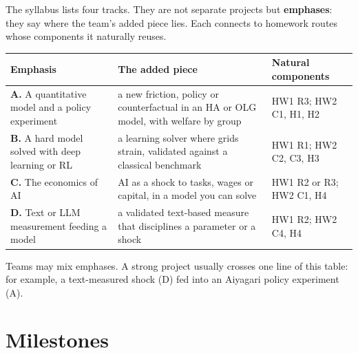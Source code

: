 \documentclass[11pt]{article}
\begin{document}
The syllabus lists four tracks. They are not separate projects but \textbf{emphases}: they say
where the team's added piece lies. Each connects to homework routes whose components it naturally
reuses.

\medskip
{\small
\renewcommand{\arraystretch}{1.2}
\noindent\begin{tabularx}{\linewidth}{@{}p{4.4cm}Lp{3.6cm}@{}}
\toprule
\textbf{Emphasis} & \textbf{The added piece} & \textbf{Natural components} \\
\midrule
\textbf{A.} A quantitative model and a policy experiment & a new friction, policy or counterfactual in an HA or OLG model, with welfare by group & HW1 R3; HW2 C1, H1, H2 \\
\textbf{B.} A hard model solved with deep learning or RL & a learning solver where grids strain, validated against a classical benchmark & HW1 R1; HW2 C2, C3, H3 \\
\textbf{C.} The economics of AI & AI as a shock to tasks, wages or capital, in a model you can solve & HW1 R2 or R3; HW2 C1, H4 \\
\textbf{D.} Text or LLM measurement feeding a model & a validated text-based measure that disciplines a parameter or a shock & HW1 R2; HW2 C4, H4 \\
\bottomrule
\end{tabularx}
}

\medskip
Teams may mix emphases. A strong project usually crosses one line of this table: for example, a
text-measured shock (D) fed into an Aiyagari policy experiment (A).

\section{Milestones}
\end{document}
